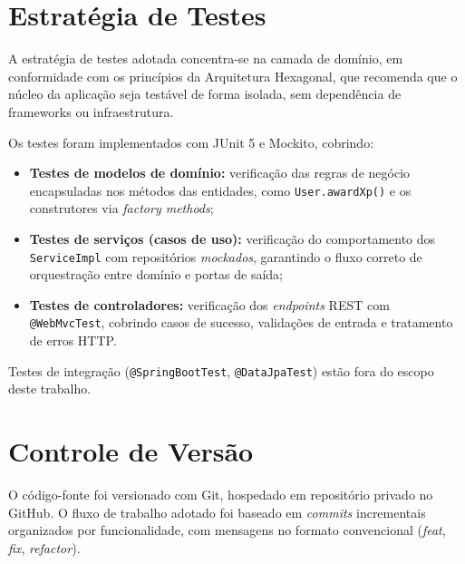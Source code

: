 \section{Estratégia de Testes}
\label{sec:estrategia-testes}

A estratégia de testes adotada concentra-se na camada de domínio, em conformidade
com os princípios da Arquitetura Hexagonal, que recomenda que o núcleo da aplicação
seja testável de forma isolada, sem dependência de frameworks ou infraestrutura.

Os testes foram implementados com JUnit 5 e Mockito, cobrindo:

\begin{itemize}
  \item \textbf{Testes de modelos de domínio:} verificação das regras de negócio
        encapsuladas nos métodos das entidades, como \texttt{User.awardXp()} e
        os construtores via \textit{factory methods};

  \item \textbf{Testes de serviços (casos de uso):} verificação do comportamento
        dos \texttt{ServiceImpl} com repositórios \textit{mockados}, garantindo
        o fluxo correto de orquestração entre domínio e portas de saída;

  \item \textbf{Testes de controladores:} verificação dos \textit{endpoints} REST
        com \texttt{@WebMvcTest}, cobrindo casos de sucesso, validações de entrada
        e tratamento de erros HTTP.
\end{itemize}

Testes de integração (\texttt{@SpringBootTest}, \texttt{@DataJpaTest}) estão fora
do escopo deste trabalho.

\section{Controle de Versão}
\label{sec:controle-versao}

O código-fonte foi versionado com Git, hospedado em repositório privado no GitHub.
O fluxo de trabalho adotado foi baseado em \textit{commits} incrementais organizados
por funcionalidade, com mensagens no formato convencional
(\textit{feat}, \textit{fix}, \textit{refactor}).
